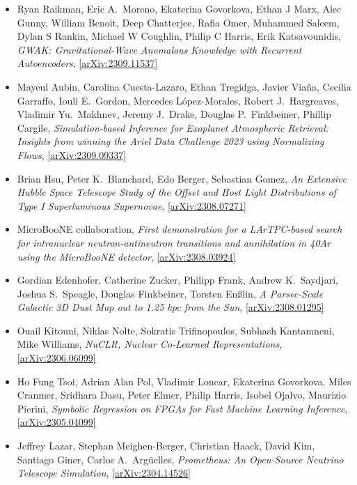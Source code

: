 \begin{itemize}
\item Ryan Raikman, Eric A.\  Moreno, Ekaterina Govorkova, Ethan J Marx, Alec Gunny, William Benoit, Deep Chatterjee, Rafia Omer, Muhammed Saleem, Dylan S Rankin, Michael W Coughlin, Philip C Harris, Erik Katsavounidis, \textit{GWAK: Gravitational-Wave Anomalous Knowledge with Recurrent Autoencoders}, \href{https://arxiv.org/abs/2309.11537}{[arXiv:2309.11537]} 
\item Mayeul Aubin, Carolina Cuesta-Lazaro, Ethan Tregidga, Javier Viaña, Cecilia Garraffo, Iouli E.\  Gordon, Mercedes López-Morales, Robert J.\  Hargreaves, Vladimir Yu.\  Makhnev, Jeremy J.\  Drake, Douglas P.\  Finkbeiner, Phillip Cargile, \textit{Simulation-based Inference for Exoplanet Atmospheric Retrieval: Insights from winning the Ariel Data Challenge 2023 using Normalizing Flows}, \href{https://arxiv.org/abs/2309.09337}{[arXiv:2309.09337]} 
\item Brian Hsu, Peter K.\  Blanchard, Edo Berger, Sebastian Gomez, \textit{An Extensive Hubble Space Telescope Study of the Offset and Host Light Distributions of Type I Superluminous Supernovae}, \href{https://arxiv.org/abs/2308.07271}{[arXiv:2308.07271]} 
\item MicroBooNE collaboration, \textit{First demonstration for a LArTPC-based search for intranuclear neutron-antineutron transitions and annihilation in 40Ar using the MicroBooNE detector}, \href{https://arxiv.org/abs/2308.03924}{[arXiv:2308.03924]} 
\item Gordian Edenhofer, Catherine Zucker, Philipp Frank, Andrew K.\  Saydjari, Joshua S.\  Speagle, Douglas Finkbeiner, Torsten Enßlin, \textit{A Parsec-Scale Galactic 3D Dust Map out to 1.25 kpc from the Sun}, \href{https://arxiv.org/abs/2308.01295}{[arXiv:2308.01295]} 
\item Ouail Kitouni, Niklas Nolte, Sokratis Trifinopoulos, Subhash Kantamneni, Mike Williams, \textit{NuCLR, Nuclear Co-Learned Representations}, \href{https://arxiv.org/abs/2306.06099}{[arXiv:2306.06099]} 
\item Ho Fung Tsoi, Adrian Alan Pol, Vladimir Loncar, Ekaterina Govorkova, Miles Cranmer, Sridhara Dasu, Peter Elmer, Philip Harris, Isobel Ojalvo, Maurizio Pierini, \textit{Symbolic Regression on FPGAs for Fast Machine Learning Inference}, \href{https://arxiv.org/abs/2305.04099}{[arXiv:2305.04099]} 
\item Jeffrey Lazar, Stephan Meighen-Berger, Christian Haack, David Kim, Santiago Giner, Carlos A.\  Argüelles, \textit{Prometheus: An Open-Source Neutrino Telescope Simulation}, \href{https://arxiv.org/abs/2304.14526}{[arXiv:2304.14526]} 

\end{itemize}
